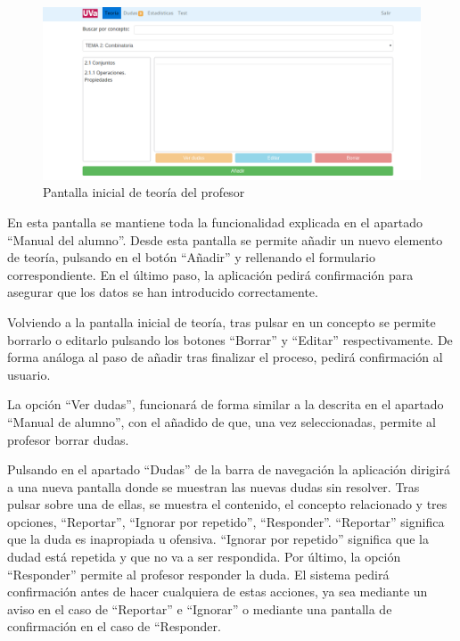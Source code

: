 \documentclass[openright,twoside,10pt]{book}
\begin{document}
    \begin{figure}[H]
        \begin{center}
            \includegraphics[width=\textwidth]{img/manual/profesor-teoria.png}
        \end{center}
        \caption{Pantalla inicial de teoría del profesor}
    \end{figure}
    
    En esta pantalla se mantiene toda la funcionalidad explicada en el
    apartado \enquote{Manual del alumno}. Desde esta pantalla se permite
    añadir un nuevo elemento de teoría, pulsando en el botón
    \enquote{Añadir} y rellenando el formulario correspondiente. En el
    último paso, la aplicación pedirá confirmación para asegurar que los
    datos se han introducido correctamente.
    
    Volviendo a la pantalla inicial de teoría, tras pulsar en un concepto se
    permite borrarlo o editarlo pulsando los botones \enquote{Borrar} y
    \enquote{Editar} respectivamente. De forma análoga al paso de añadir
    tras finalizar el proceso, pedirá confirmación al usuario.
    
    La opción \enquote{Ver dudas}, funcionará de forma similar a la descrita
    en el apartado \enquote{Manual de alumno}, con el añadido de que, una
    vez seleccionadas, permite al profesor borrar dudas.
    
    Pulsando en el apartado \enquote{Dudas} de la barra de navegación la
    aplicación dirigirá a una nueva pantalla donde se muestran las nuevas
    dudas sin resolver. Tras pulsar sobre una de ellas, se muestra el
    contenido, el concepto relacionado y tres opciones, \enquote{Reportar},
    \enquote{Ignorar por repetido}, \enquote{Responder}. \enquote{Reportar}
    significa que la duda es inapropiada u ofensiva. \enquote{Ignorar por
    repetido} significa que la dudad está repetida y que no va a ser
    respondida. Por último, la opción \enquote{Responder} permite al
    profesor responder la duda. El sistema pedirá confirmación antes de
    hacer cualquiera de estas acciones, ya sea mediante un aviso en el caso
    de \enquote{Reportar} e \enquote{Ignorar} o mediante una pantalla de
    confirmación en el caso de ``Responder.
    
\end{document}
